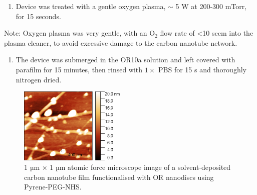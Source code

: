 \documentclass[
  a4paper,
]{scrbook}
\providecommand{\tightlist}{%
  \setlength{\itemsep}{0pt}\setlength{\parskip}{0pt}}\usepackage{longtable,booktabs,array}
\begin{document}
\begin{enumerate}
\def\labelenumi{\arabic{enumi}.}
\setcounter{enumi}{3}
\tightlist
\item
  Device was treated with a gentle oxygen plasma, \(\sim\) 5 W at
  200-300 mTorr, for 15 seconds.
\end{enumerate}

Note: Oxygen plasma was very gentle, with an O\(_2\) flow rate of
\textless10 sccm into the plasma cleaner, to avoid excessive damage to
the carbon nanotube network.

\begin{enumerate}
\def\labelenumi{\arabic{enumi}.}
\setcounter{enumi}{4}
\tightlist
\item
  The device was submerged in the OR10a solution and left covered with
  parafilm for 15 minutes, then rinsed with \(1 \times\) PBS for 15 s
  and thoroughly nitrogen dried.
\end{enumerate}

\begin{figure}

{\centering \includegraphics[width=0.45\textwidth,height=\textheight]{figures/ch8/Ned_funcverification_PPNHSwamine_R_1um_20220414_00466.png}

}

\caption{\label{fig-PPN-linker}1 µm \(\times\) 1 µm atomic force
microscope image of a solvent-deposited carbon nanotube film
functionalised with OR nanodiscs using Pyrene-PEG-NHS.}

\end{figure}
\end{document}
